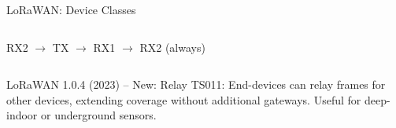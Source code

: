 \documentclass[aspectratio=169,11pt]{beamer}
\begin{document}
\begin{frame}{LoRaWAN: Device Classes}
\begin{columns}
        \vspace{0.2cm}
        \begin{center}
        \scriptsize
        RX2 $\rightarrow$ TX $\rightarrow$ RX1 $\rightarrow$ RX2 (always)
        \normalsize
        \end{center}
    \end{columns}
    
    \vspace{0.3cm}
    \begin{alertblock}{LoRaWAN 1.0.4 (2023) -- New: Relay}
        TS011: End-devices can relay frames for other devices, extending coverage without additional gateways. Useful for deep-indoor or underground sensors.
    \end{alertblock}
\end{frame}
\end{document}
